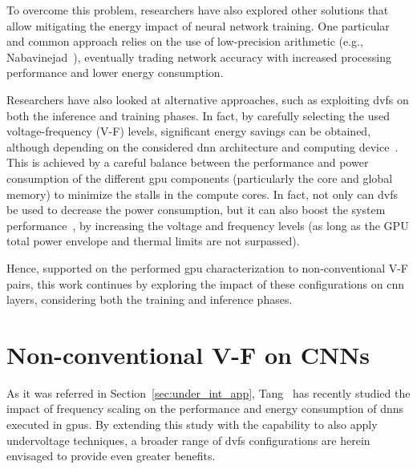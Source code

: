 To overcome this problem, researchers have also explored other solutions that allow mitigating the energy impact of neural network training. One particular and common approach relies on the use of low-precision arithmetic (e.g., Nabavinejad~\cite{nabavinejad_coordinated_2019}), eventually trading network accuracy with increased processing performance and lower energy consumption.

Researchers have also looked at alternative approaches, such as exploiting \acrshort{dvfs} on both the inference and training phases. In fact, by carefully selecting the used voltage-frequency (V-F) levels, significant energy savings can be obtained, although depending on the considered \acrshort{dnn} architecture and computing  device~\cite{tang_impact_2019}. This is achieved by a careful balance between the performance and power consumption of the different \acrshort{gpu} components  (particularly the core and global memory) to minimize the stalls in the compute cores. In fact, not only can \acrshort{dvfs} be used to decrease the power consumption, but it can also boost the system performance~\cite{tang_impact_2019}, by increasing the voltage and frequency levels (as long as the GPU total power envelope and thermal limits are not surpassed).



Hence, supported on the performed \acrshort{gpu} characterization to non-conventional V-F pairs, this work continues by exploring the impact of these configurations on \acrshort{cnn} layers, considering both the training and inference phases.

\section{Non-conventional V-F on CNNs}
\label{section:baseline}

As it was referred in Section~\ref{sec:under_int_app}, Tang~\cite{tang_impact_2019} has recently studied the impact of frequency scaling on the performance and energy consumption of \acrshort{dnn}s executed in \acrshort{gpu}s. By extending this study with the capability to also apply undervoltage techniques, a broader range of \acrshort{dvfs} configurations are herein envisaged to provide even greater benefits. 

